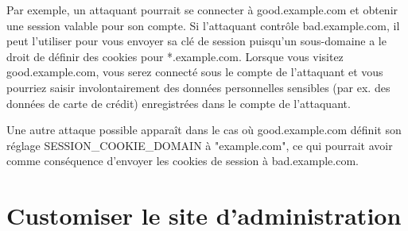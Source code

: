 \documentclass[11pt,a4paper]{article}
\begin{document}
\begin{enumerate}
Par exemple, un attaquant pourrait se connecter à good.example.com et obtenir une session valable pour son compte. Si l’attaquant contrôle bad.example.com, il peut l’utiliser pour vous envoyer sa clé de session puisqu’un sous-domaine a le droit de définir des cookies pour *.example.com. Lorsque vous visitez good.example.com, vous serez connecté sous le compte de l’attaquant et vous pourriez saisir involontairement des données personnelles sensibles (par ex. des données de carte de crédit) enregistrées dans le compte de l’attaquant.

Une autre attaque possible apparaît dans le cas où good.example.com définit son réglage SESSION\_COOKIE\_DOMAIN à "example.com", ce qui pourrait avoir comme conséquence d’envoyer les cookies de session à bad.example.com.
\end{enumerate}
\section{Customiser le site d'administration}
\end{document}
